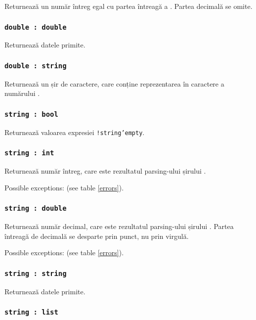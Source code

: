 Returnează un număr întreg egal cu partea întreagă a \double. Partea decimală se omite.

\subsubsection{\texttt{double : double}}

Returnează datele primite.

\subsubsection{\texttt{double : string}}

Returnează un șir de caractere, care conține reprezentarea în caractere a numărului \double.

\subsubsection{\texttt{string : bool}}

Returnează valoarea expresiei \texttt{!string'empty}.

\subsubsection{\texttt{string : int}}

Returnează număr întreg, care este rezultatul parsing-ului șirului \str.

Possible exceptions:  (see table \ref{errors}).

\subsubsection{\texttt{string : double}}

Returnează număr decimal, care este rezultatul parsing-ului șirului \str. Partea întreagă de decimală se desparte prin punct, nu prin virgulă.

Possible exceptions:  (see table \ref{errors}).

\subsubsection{\texttt{string : string}}

Returnează datele primite.

\subsubsection{\texttt{string : list}}

